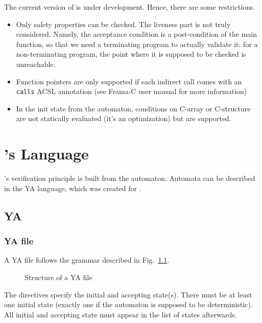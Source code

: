 \documentclass{frama-c-book}
\begin{document}
The current version of \aorai is under development. Hence, there are
some restrictions.
\begin{itemize}
\item Only safety properties can be checked. The liveness
  part is not truly considered. Namely, the acceptance condition is a post-condition
  of the main function, so that we need a terminating program to actually validate
  it: for a non-terminating program, the point where it is supposed to be checked is
  unreachable.
  \item Function pointers are only supported if each indirect call comes with
    an \lstinline|calls| ACSL annotation (see Frama-C user manual for more information)
  \item In the init state from the automaton, conditions on C-array or
    C-structure are not statically evaluated (it's an optimization)
    but are supported.
\end{itemize}


\chapter{\aorai's Language}
\aorai's verification principle is built from the
automaton. Automata can be described in the YA language, which was created for \aorai.

\section{YA}
\label{sec:ya}
\lstset{language=ya}
\subsection{YA file}\label{sec:ya-file}
A YA file follows the grammar described in Fig.~\ref{ya-file}.
\begin{figure}[htb]

\caption{Structure of a YA file}\label{ya-file}
\end{figure}
The directives specify the initial and accepting state(s). There must be at
least one initial state (exactly one if the automaton is supposed to be
deterministic). All initial and accepting state must appear in the list of
states afterwards.
\end{document}
